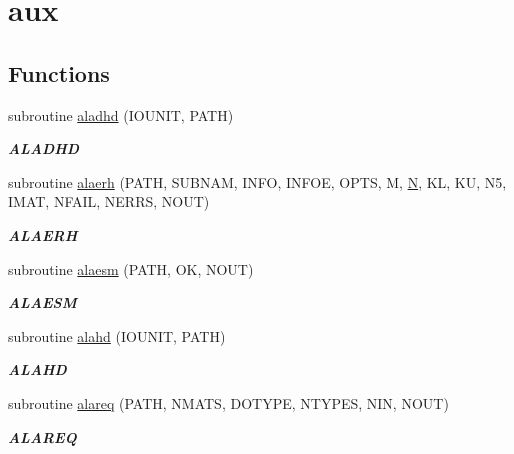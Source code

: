 \hypertarget{group__aux__lin}{}\section{aux}
\label{group__aux__lin}
\subsection*{Functions}
\begin{DoxyCompactItemize}
\item 
subroutine \hyperlink{group__aux__lin_ga43c917c7aed0f5b199f88702afcb4801}{aladhd} (I\+O\+U\+N\+I\+T, P\+A\+T\+H)
\begin{DoxyCompactList}\small\item\em {\bfseries A\+L\+A\+D\+H\+D} \end{DoxyCompactList}\item 
subroutine \hyperlink{group__aux__lin_ga544fc1eb5882794214238ad87cda0b40}{alaerh} (P\+A\+T\+H, S\+U\+B\+N\+A\+M, I\+N\+F\+O, I\+N\+F\+O\+E, O\+P\+T\+S, M, \hyperlink{polmisc_8c_a0240ac851181b84ac374872dc5434ee4}{N}, K\+L, K\+U, N5, I\+M\+A\+T, N\+F\+A\+I\+L, N\+E\+R\+R\+S, N\+O\+U\+T)
\begin{DoxyCompactList}\small\item\em {\bfseries A\+L\+A\+E\+R\+H} \end{DoxyCompactList}\item 
subroutine \hyperlink{group__aux__lin_ga7e95a0425b51195944be2389d11469c9}{alaesm} (P\+A\+T\+H, O\+K, N\+O\+U\+T)
\begin{DoxyCompactList}\small\item\em {\bfseries A\+L\+A\+E\+S\+M} \end{DoxyCompactList}\item 
subroutine \hyperlink{group__aux__lin_ga20b03b7c76718fe782fcd11607de99ef}{alahd} (I\+O\+U\+N\+I\+T, P\+A\+T\+H)
\begin{DoxyCompactList}\small\item\em {\bfseries A\+L\+A\+H\+D} \end{DoxyCompactList}\item 
subroutine \hyperlink{group__aux__lin_ga0700b15ddc94106ea2d9fe4c97f8cdeb}{alareq} (P\+A\+T\+H, N\+M\+A\+T\+S, D\+O\+T\+Y\+P\+E, N\+T\+Y\+P\+E\+S, N\+I\+N, N\+O\+U\+T)
\begin{DoxyCompactList}\small\item\em {\bfseries A\+L\+A\+R\+E\+Q} \end{DoxyCompactList}\item 

\end{DoxyCompactItemize}
